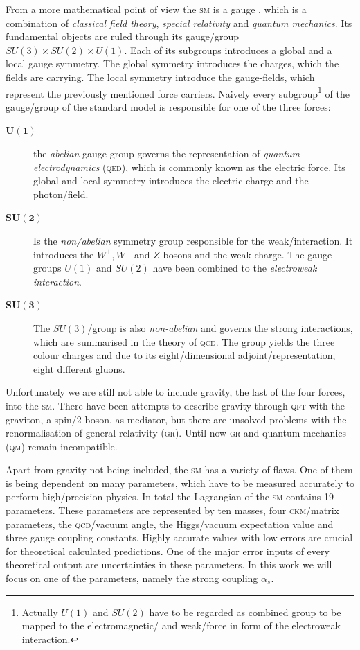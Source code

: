 \documentclass[../../index.tex]{subfiles}
\begin{document}
From a more mathematical point of view the \textsc{sm} is a gauge
, which is a combination of \textit{classical
  field theory}, \textit{special relativity} and \textit{quantum mechanics}. Its
fundamental objects are ruled through its gauge\-/group \(SU(3)\times
SU(2)\times U(1)\). Each of its subgroups introduces a global and a local gauge
symmetry. The global symmetry introduces the charges, which the fields are
carrying. The local symmetry introduce the gauge-fields, which represent the
previously mentioned force carriers. Naively every subgroup\footnote{Actually
  \(U(1)\) and \(SU(2)\) have to be regarded as combined group to be mapped to
  the electromagnetic\-/ and weak\-/force in form of the electroweak
  interaction.} of the gauge\-/group of the standard model is responsible for
one of the three forces:
\begin{description}
\item[\(\bm{U(1)}\)] the \textit{abelian} gauge group governs the representation
  of \textit{quantum electrodynamics} (\textsc{qed}), which is commonly known as
  the electric force. Its global and local symmetry introduces the electric
  charge and the photon\-/field.
\item[\(\bm{SU(2)}\)] Is the \textit{non\-/abelian} symmetry group responsible
  for the weak\-/interaction. It introduces the \(W^+,W^-\) and \(Z\) bosons and
  the weak charge. The gauge groups \(U(1)\) and \(SU(2)\) have been combined to
  the \textit{electroweak interaction}.
\item[\(\bm{SU(3)}\)] The \(SU(3)\)\-/group is also \textit{non-abelian} and
  governs the strong interactions, which are summarised in the theory of
  \textsc{qcd}. The group yields the three colour
  charges and due to its eight\-/dimensional adjoint\-/representation, eight
  different gluons.
\end{description}
Unfortunately we are still not able to include gravity, the last of the four
forces, into the \textsc{sm}. There have been attempts to describe gravity
through \textsc{qft} with the graviton, a spin\-/2 boson, as mediator, but there
are unsolved problems with the renormalisation of general relativity
(\textsc{gr}). Until now \textsc{gr} and quantum mechanics (\textsc{qm}) remain
incompatible.

Apart from gravity not being included, the \textsc{sm} has a variety of flaws.
One of them is being dependent on many parameters, which have to be measured
accurately to perform high\-/precision physics. In total the Lagrangian of the
\textsc{sm} contains 19 parameters. These parameters are represented by ten
masses, four \textsc{ckm}\-/matrix parameters, the \textsc{qcd}\-/vacuum angle,
the Higgs\-/vacuum expectation value and three gauge coupling constants. Highly
accurate values with low errors are crucial for theoretical calculated
predictions. One of the major error inputs of every theoretical output are
uncertainties in these parameters. In this work we will focus on one of the
parameters, namely the strong coupling \(\alpha_s\).
\end{document}
